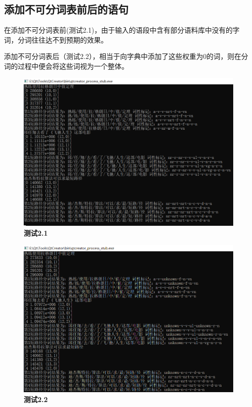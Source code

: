 \documentclass[UTF8]{ctexart}
\begin{document}
\subsection{添加不可分词表前后的语句}
在添加不可分词表前(测试2.1)，由于输入的语段中含有部分语料库中没有的字词，分词往往达不到预期的效果。\par
添加不可分词表后（测试2.2），相当于向字典中添加了这些权重为0的词，则在分词的过程中便会将这些词视为一个整体。
\begin{figure}[H]
\centerline{
\includegraphics[scale = .5]{test2.png}
}
\caption{\textbf{测试2.1}}
\end{figure}
\begin{figure}[H]
\centerline{
\includegraphics[scale = .5]{test2-1.png}
}
\caption{\textbf{测试2.2}}
\end{figure}
\end{document}
